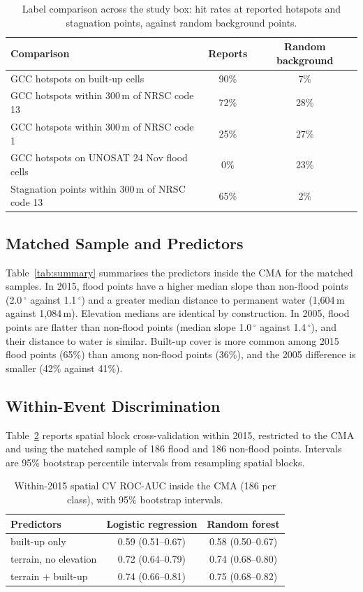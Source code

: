 \documentclass[conference]{IEEEtran}
\begin{document}
\begin{table}[h]
\centering
\caption{Label comparison across the study box: hit rates at reported hotspots and stagnation points, against random background points.}
\label{tab:labels}
\begin{tabular}{lcc}
\toprule
Comparison & Reports & Random background \\
\midrule
GCC hotspots on built-up cells & 90\% & 7\% \\
GCC hotspots within 300\,m of NRSC code 13 & 72\% & 28\% \\
GCC hotspots within 300\,m of NRSC code 1 & 25\% & 27\% \\
GCC hotspots on UNOSAT 24 Nov flood cells & 0\% & 23\% \\
Stagnation points within 300\,m of NRSC code 13 & 65\% & 2\% \\
\bottomrule
\end{tabular}
\end{table}

\subsection{Matched Sample and Predictors}
Table~\ref{tab:summary} summarises the predictors inside the CMA for the matched samples. In 2015, flood points have a higher median slope than non-flood points (2.0\,$^\circ$ against 1.1\,$^\circ$) and a greater median distance to permanent water (1,604\,m against 1,084\,m). Elevation medians are identical by construction. In 2005, flood points are flatter than non-flood points (median slope 1.0\,$^\circ$ against 1.4\,$^\circ$), and their distance to water is similar. Built-up cover is more common among 2015 flood points (65\%) than among non-flood points (36\%), and the 2005 difference is smaller (42\% against 41\%).

\subsection{Within-Event Discrimination}
Table~\ref{tab:within} reports spatial block cross-validation within 2015, restricted to the CMA and using the matched sample of 186 flood and 186 non-flood points. Intervals are 95\% bootstrap percentile intervals from resampling spatial blocks.

\begin{table}[h]
\centering
\caption{Within-2015 spatial CV ROC-AUC inside the CMA (186 per class), with 95\% bootstrap intervals.}
\label{tab:within}
\begin{tabular}{lcc}
\toprule
Predictors & Logistic regression & Random forest \\
\midrule
built-up only & 0.59 (0.51--0.67) & 0.58 (0.50--0.67) \\
terrain, no elevation & 0.72 (0.64--0.79) & 0.74 (0.68--0.80) \\
terrain + built-up & 0.74 (0.66--0.81) & 0.75 (0.68--0.82) \\
\bottomrule
\end{tabular}
\end{table}
\end{document}

